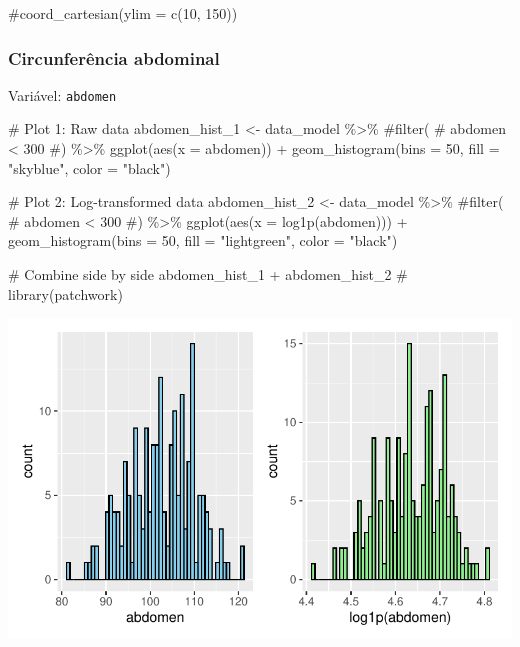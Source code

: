 \documentclass[
  12pt,
]{article}
\newenvironment{Shaded}{\begin{snugshade}}{\end{snugshade}}
\newcommand{\AttributeTok}[1]{\textcolor[rgb]{0.40,0.45,0.13}{#1}}
\newcommand{\CommentTok}[1]{\textcolor[rgb]{0.37,0.37,0.37}{#1}}
\newcommand{\DecValTok}[1]{\textcolor[rgb]{0.68,0.00,0.00}{#1}}
\newcommand{\FunctionTok}[1]{\textcolor[rgb]{0.28,0.35,0.67}{#1}}
\newcommand{\NormalTok}[1]{\textcolor[rgb]{0.00,0.23,0.31}{#1}}
\newcommand{\OtherTok}[1]{\textcolor[rgb]{0.00,0.23,0.31}{#1}}
\newcommand{\SpecialCharTok}[1]{\textcolor[rgb]{0.37,0.37,0.37}{#1}}
\newcommand{\StringTok}[1]{\textcolor[rgb]{0.13,0.47,0.30}{#1}}
\begin{document}
\begin{Shaded}
\begin{Highlighting}[]
    \CommentTok{\#coord\_cartesian(ylim = c(10, 150))}
\end{Highlighting}
\end{Shaded}

\subsubsection{Circunferência
abdominal}\label{circunferuxeancia-abdominal}

Variável: \texttt{abdomen}

\begin{Shaded}
\begin{Highlighting}[]
\CommentTok{\# Plot 1: Raw data}
\NormalTok{abdomen\_hist\_1 }\OtherTok{\textless{}{-}}\NormalTok{ data\_model }\SpecialCharTok{\%\textgreater{}\%} 
    \CommentTok{\#filter(}
    \CommentTok{\#    abdomen \textless{} 300}
    \CommentTok{\#) \%\textgreater{}\% }
    \FunctionTok{ggplot}\NormalTok{(}\FunctionTok{aes}\NormalTok{(}\AttributeTok{x =}\NormalTok{ abdomen)) }\SpecialCharTok{+} 
    \FunctionTok{geom\_histogram}\NormalTok{(}\AttributeTok{bins =} \DecValTok{50}\NormalTok{, }\AttributeTok{fill =} \StringTok{"skyblue"}\NormalTok{, }\AttributeTok{color =} \StringTok{"black"}\NormalTok{)}

\CommentTok{\# Plot 2: Log{-}transformed data}
\NormalTok{abdomen\_hist\_2 }\OtherTok{\textless{}{-}}\NormalTok{ data\_model }\SpecialCharTok{\%\textgreater{}\%} 
    \CommentTok{\#filter(}
    \CommentTok{\#    abdomen \textless{} 300}
    \CommentTok{\#) \%\textgreater{}\%}
    \FunctionTok{ggplot}\NormalTok{(}\FunctionTok{aes}\NormalTok{(}\AttributeTok{x =} \FunctionTok{log1p}\NormalTok{(abdomen))) }\SpecialCharTok{+} 
    \FunctionTok{geom\_histogram}\NormalTok{(}\AttributeTok{bins =} \DecValTok{50}\NormalTok{, }\AttributeTok{fill =} \StringTok{"lightgreen"}\NormalTok{, }\AttributeTok{color =} \StringTok{"black"}\NormalTok{)}

\CommentTok{\# Combine side by side}
\NormalTok{abdomen\_hist\_1 }\SpecialCharTok{+}\NormalTok{ abdomen\_hist\_2 }\CommentTok{\# library(patchwork)}
\end{Highlighting}
\end{Shaded}

\includegraphics{Outcomes_files/figure-pdf/abdomen_1-1.pdf}
\end{document}
